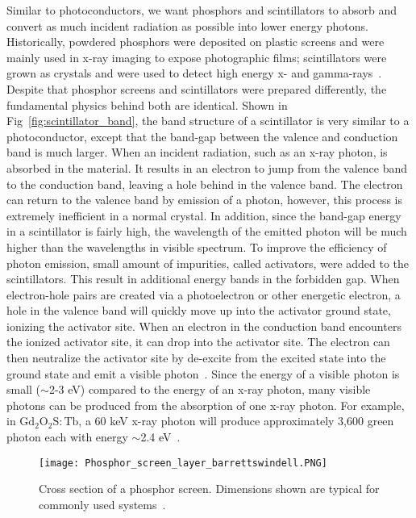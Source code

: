 Similar to photoconductors, we want phosphors and scintillators to absorb and convert as much incident radiation as possible into lower energy photons.  Historically, powdered phosphors were deposited on plastic screens and were mainly used in x-ray imaging to expose photographic films; scintillators were grown as crystals and were used to detect high energy x- and gamma-rays~\citep{Nikl2006}.  Despite that phosphor screens and scintillators were prepared differently, the fundamental physics behind both are identical.  Shown in Fig~\ref{fig:scintillator_band}, the band structure of a scintillator is very similar to a photoconductor, except that the band-gap between the valence and conduction band is much larger.  When an incident radiation, such as an x-ray photon, is absorbed in the material.  It results in an electron to jump from the valence band to the conduction band, leaving a hole behind in the valence band.  The electron can return to the valence band by emission of a photon, however, this process is extremely inefficient in a normal crystal.  In addition, since the band-gap energy in a scintillator is fairly high, the wavelength of the emitted photon will be much higher than the wavelengths in visible spectrum.  To improve the efficiency of photon emission, small amount of impurities, called activators, were added to the scintillators.  This result in additional energy bands in the forbidden gap.  When electron-hole pairs are created via a photoelectron or other energetic electron, a hole in the valence band will quickly move up into the activator ground state, ionizing the activator site.  When an electron in the conduction band encounters the ionized activator site, it can drop into the activator site.  The electron can then neutralize the activator site by de-excite from the excited state into the ground state and emit a visible photon~\citep{Knoll2010}.  Since the energy of a visible photon is small ($\sim$2-3 eV) compared to the energy of an x-ray photon, many visible photons can be produced from the absorption of one x-ray photon.  For example, in $\mathrm{Gd_2O_2S:Tb}$, a 60 keV x-ray photon will produce approximately 3,600 green photon each with energy $\sim$2.4 eV~\citep{Rowlands2000}.
%

\begin{figure}[h]
\texttt{[image: Phosphor\_screen\_layer\_barrettswindell.PNG]}
\caption{Cross section of a phosphor screen.  Dimensions shown are typical for commonly used systems~\citep{Barrett1981}.}
\label{fig:phosphor_cross_section}
\end{figure}

